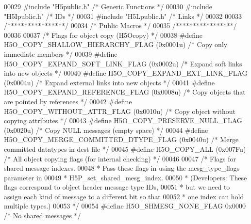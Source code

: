 \begin{DoxyCode}
00029 \textcolor{preprocessor}{#include "H5public.h"}       \textcolor{comment}{/* Generic Functions            */}
00030 \textcolor{preprocessor}{#include "H5Ipublic.h"}      \textcolor{comment}{/* IDs                  */}
00031 \textcolor{preprocessor}{#include "H5Lpublic.h"}      \textcolor{comment}{/* Links                */}
00032 
00033 \textcolor{comment}{/*****************/}
00034 \textcolor{comment}{/* Public Macros */}
00035 \textcolor{comment}{/*****************/}
00036 
00037 \textcolor{comment}{/* Flags for object copy (H5Ocopy) */}
00038 \textcolor{preprocessor}{#define H5O\_COPY\_SHALLOW\_HIERARCHY\_FLAG (0x0001u)   }\textcolor{comment}{/* Copy only immediate members */}\textcolor{preprocessor}{}
00039 \textcolor{preprocessor}{#define H5O\_COPY\_EXPAND\_SOFT\_LINK\_FLAG  (0x0002u)   }\textcolor{comment}{/* Expand soft links into new objects */}\textcolor{preprocessor}{}
00040 \textcolor{preprocessor}{#define H5O\_COPY\_EXPAND\_EXT\_LINK\_FLAG   (0x0004u)   }\textcolor{comment}{/* Expand external links into new objects */}\textcolor{preprocessor}{}
00041 \textcolor{preprocessor}{#define H5O\_COPY\_EXPAND\_REFERENCE\_FLAG  (0x0008u)   }\textcolor{comment}{/* Copy objects that are pointed by references */}\textcolor{preprocessor}{}
00042 \textcolor{preprocessor}{#define H5O\_COPY\_WITHOUT\_ATTR\_FLAG      (0x0010u)   }\textcolor{comment}{/* Copy object without copying attributes */}\textcolor{preprocessor}{}
00043 \textcolor{preprocessor}{#define H5O\_COPY\_PRESERVE\_NULL\_FLAG     (0x0020u)   }\textcolor{comment}{/* Copy NULL messages (empty space) */}\textcolor{preprocessor}{}
00044 \textcolor{preprocessor}{#define H5O\_COPY\_MERGE\_COMMITTED\_DTYPE\_FLAG (0x0040u)   }\textcolor{comment}{/* Merge committed datatypes in dest file */}\textcolor{preprocessor}{}
00045 \textcolor{preprocessor}{#define H5O\_COPY\_ALL                    (0x007Fu)   }\textcolor{comment}{/* All object copying flags (for internal checking) */}\textcolor{preprocessor}{}
00046 
00047 \textcolor{comment}{/* Flags for shared message indexes.}
00048 \textcolor{comment}{ * Pass these flags in using the mesg\_type\_flags parameter in}
00049 \textcolor{comment}{ * H5P\_set\_shared\_mesg\_index.}
00050 \textcolor{comment}{ * (Developers: These flags correspond to object header message type IDs,}
00051 \textcolor{comment}{ * but we need to assign each kind of message to a different bit so that}
00052 \textcolor{comment}{ * one index can hold multiple types.)}
00053 \textcolor{comment}{ */}
00054 \textcolor{preprocessor}{#define H5O\_SHMESG\_NONE\_FLAG    0x0000          }\textcolor{comment}{/* No shared messages */}\textcolor{preprocessor}{}

\end{DoxyCode}
